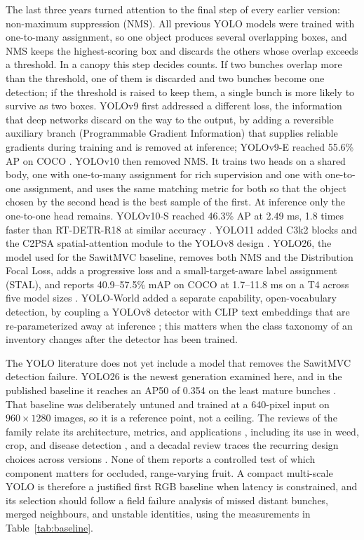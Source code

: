 The last three years turned attention to the final step of every earlier version: non-maximum suppression (NMS). All previous YOLO models were trained with one-to-many assignment, so one object produces several overlapping boxes, and NMS keeps the highest-scoring box and discards the others whose overlap exceeds a threshold. In a canopy this step decides counts. If two bunches overlap more than the threshold, one of them is discarded and two bunches become one detection; if the threshold is raised to keep them, a single bunch is more likely to survive as two boxes. YOLOv9 first addressed a different loss, the information that deep networks discard on the way to the output, by adding a reversible auxiliary branch (Programmable Gradient Information) that supplies reliable gradients during training and is removed at inference; YOLOv9-E reached 55.6\% AP on COCO \cite{wang2024yolov9}. YOLOv10 then removed NMS. It trains two heads on a shared body, one with one-to-many assignment for rich supervision and one with one-to-one assignment, and uses the same matching metric for both so that the object chosen by the second head is the best sample of the first. At inference only the one-to-one head remains. YOLOv10-S reached 46.3\% AP at 2.49 ms, 1.8 times faster than RT-DETR-R18 at similar accuracy \cite{wang2024yolov10}. YOLO11 added C3k2 blocks and the C2PSA spatial-attention module to the YOLOv8 design \cite{khanam2024yolov11}. YOLO26, the model used for the SawitMVC baseline, removes both NMS and the Distribution Focal Loss, adds a progressive loss and a small-target-aware label assignment (STAL), and reports 40.9--57.5\% mAP on COCO at 1.7--11.8 ms on a T4 across five model sizes \cite{sapkota2025yolo26}. YOLO-World added a separate capability, open-vocabulary detection, by coupling a YOLOv8 detector with CLIP text embeddings that are re-parameterized away at inference \cite{cheng2024yoloworld}; this matters when the class taxonomy of an inventory changes after the detector has been trained.

The YOLO literature does not yet include a model that removes the SawitMVC detection failure. YOLO26 is the newest generation examined here, and in the published baseline it reaches an AP50 of 0.354 on the least mature bunches \cite{indriani2026sawitmvc}. That baseline was deliberately untuned and trained at a 640-pixel input on $960\times1280$ images, so it is a reference point, not a ceiling. The reviews of the family relate its architecture, metrics, and applications \cite{jiang2022yoloreview,terven2023yolo,hussain2023yolo,vijayakumar2024yolo}, including its use in weed, crop, and disease detection \cite{sapkota2024yoloagri}, and a decadal review traces the recurring design choices across versions \cite{sapkota2025yologenesis}. None of them reports a controlled test of which component matters for occluded, range-varying fruit. A compact multi-scale YOLO is therefore a justified first RGB baseline when latency is constrained, and its selection should follow a field failure analysis of missed distant bunches, merged neighbours, and unstable identities, using the measurements in Table~\ref{tab:baseline}.

